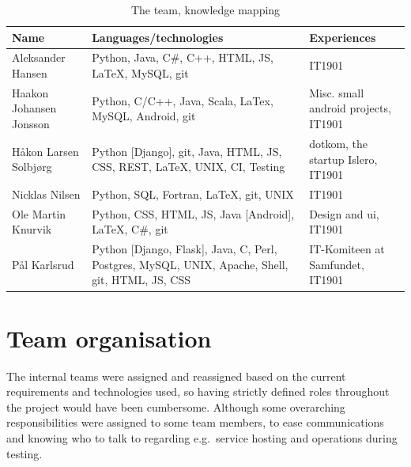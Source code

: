 \begin{table}[H]
    \caption{The team, knowledge mapping}
    \centering
    \begin{tabular}{|l|p{5cm}|p{5cm}<{\raggedright}|}
    \hline
    \textbf{Name} & 
    \textbf{Languages/technologies} & 
    \textbf{Experiences} 
    \\ \hline
    
    Aleksander Hansen & 
    Python, Java, C\#, C++, HTML, JS, LaTeX, MySQL, git & 
    IT1901
    \\ \hline
     
    Haakon Johansen Jonsson &
    Python, C/C++, Java, Scala, LaTex,  MySQL, Android, git & 
    Misc. small android projects, IT1901 
    \\ \hline
    
    Håkon Larsen Solbjørg & 
    Python {[Django]}, git, Java, HTML, JS, CSS, REST, LaTeX, UNIX, CI, Testing &
    dotkom, the startup Islero, IT1901
    \\ \hline
    
    Nicklas Nilsen & 
    Python, SQL, Fortran, LaTeX, git, UNIX & 
    IT1901 
    \\ \hline
    
    Ole Martin Knurvik & 
    Python, CSS, HTML, JS, Java {[Android]}, LaTeX, C\#, git & 
    Design and \acrshort{ui}, IT1901
    \\ \hline
    
    Pål Karlsrud & 
    Python {[Django, Flask]}, Java, C, Perl, Postgres, MySQL, UNIX, Apache, Shell, git, HTML, JS, CSS & 
    IT-Komiteen at Samfundet, IT1901
    \\ \hline
    \end{tabular}
    \label{table:theTeam}
\end{table}

\section{Team organisation}

The internal teams were assigned and reassigned based on the current requirements and technologies used, so having strictly defined roles throughout the project would have been cumbersome. Although some overarching responsibilities were assigned to some team members, to ease communications and knowing who to talk to regarding e.g.\ service hosting and operations during testing.

